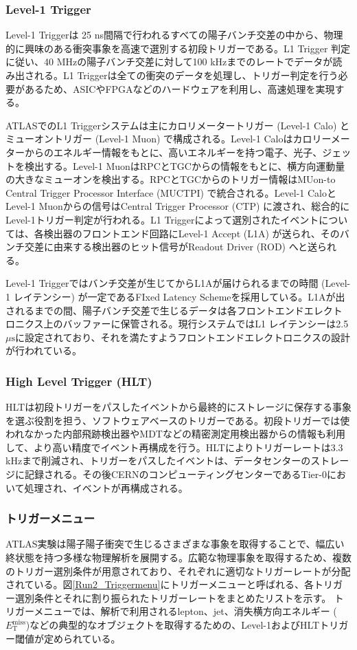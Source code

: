     \subsubsection{Level-1 Trigger}
    \baselineskip
    Level-1 Triggerは 25 ns間隔で行われるすべての陽子バンチ交差の中から、物理的に興味のある衝突事象を高速で選別する初段トリガーである。L1 Trigger 判定に従い、40 MHzの陽子バンチ交差に対して100 kHzまでのレートでデータが読み出される。L1 Triggerは全ての衝突のデータを処理し、トリガー判定を行う必要があるため、ASICやFPGAなどのハードウェアを利用し、高速処理を実現する。

    ATLASでのL1 Triggerシステムは主にカロリメータートリガー (Level-1 Calo) と ミューオントリガー (Level-1 Muon) で構成される。Level-1 Caloはカロリーメーターからのエネルギー情報をもとに、高いエネルギーを持つ電子、光子、ジェットを検出する。Level-1 MuonはRPCとTGCからの情報をもとに、横方向運動量の大きなミューオンを検出する。RPCとTGCからのトリガー情報はMUon-to Central Trigger Processor Interface (MUCTPI) で統合される。Level-1 CaloとLevel-1 Muonからの信号はCentral Trigger Processor (CTP) に渡され、総合的にLevel-1トリガー判定が行われる。L1 Triggerによって選別されたイベントについては、各検出器のフロントエンド回路にLevel-1 Accept (L1A) が送られ、そのバンチ交差に由来する検出器のヒット信号がReadout Driver (ROD) へと送られる。

    Level-1 Triggerではバンチ交差が生じてからL1Aが届けられるまでの時間 (Level-1 レイテンシー) が一定であるFIxed Latency Schemeを採用している。L1Aが出されるまでの間、陽子バンチ交差で生じるデータは各フロントエンドエレクトロニクス上のバッファーに保管される。現行システムではL1 レイテンシーは2.5 $\mu\mathrm{s}$に設定されており、それを満たすようフロントエンドエレクトロニクスの設計が行われている。

    \subsubsection {High Level Trigger (HLT)}
    \baselineskip
    HLTは初段トリガーをパスしたイベントから最終的にストレージに保存する事象を選ぶ役割を担う、ソフトウェアベースのトリガーである。初段トリガーでは使われなかった内部飛跡検出器やMDTなどの精密測定用検出器からの情報も利用して、より高い精度でイベント再構成を行う。HLTによりトリガーレートは3.3 kHzまで削減され、トリガーをパスしたイベントは、データセンターのストレージに記録される。その後CERNのコンピューティングセンターであるTier-0において処理され、イベントが再構成される。

    \subsubsection {トリガーメニュー}
    ATLAS実験は陽子陽子衝突で生じるさまざまな事象を取得することで、幅広い終状態を持つ多様な物理解析を展開する。広範な物理事象を取得するため、複数のトリガー選別条件が用意されており、それぞれに適切なトリガーレートが分配されている。図\ref{Run2_Triggermenu}にトリガーメニューと呼ばれる、各トリガー選別条件とそれに割り振られたトリガーレートをまとめたリストを示す。
    トリガーメニューでは、解析で利用されるlepton、jet、消失横方向エネルギー ($E_\mathrm{T}^{\mathrm{miss}}$)などの典型的なオブジェクトを取得するための、Level-1およびHLTトリガー閾値が定められている。

